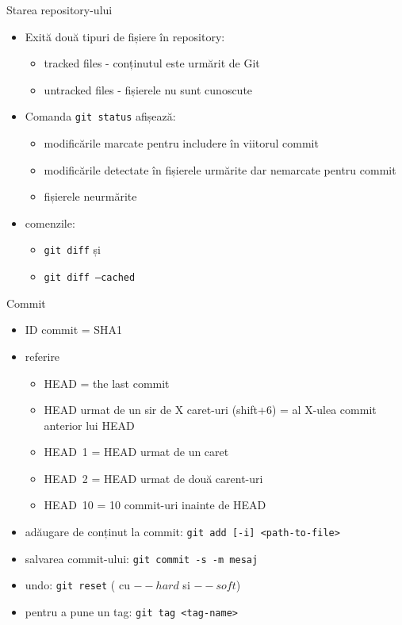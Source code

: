 \documentclass{beamer}
\begin{document}
\begin{frame}{Starea repository-ului}
\begin{itemize} %
\item Exită două tipuri de fișiere în repository:
\begin{itemize} %
	\item tracked files - conținutul este urmărit de Git
	\item untracked files - fișierele nu sunt cunoscute
\end{itemize}
\pause\item Comanda \texttt{git status} afișează:
\begin{itemize} %
	\item modificările marcate pentru includere în viitorul commit
	\item modificările detectate în fișierele urmărite dar nemarcate pentru commit
	\item fișierele neurmărite
\end{itemize}
\item comenzile:
\begin{itemize} %
	\item \texttt{git diff} și
	\item \texttt{git diff --cached}
\end{itemize}
\end{itemize}
\end{frame}

\begin{frame}{Commit}
\begin{itemize} %
\item ID commit = SHA1
\item referire
\begin{itemize}
	\item HEAD = the last commit
	\item HEAD urmat de un sir de X caret-uri (shift+6) = al X-ulea commit anterior lui HEAD
	\item HEAD~1 = HEAD urmat de un caret
    \item HEAD~2 = HEAD urmat de două carent-uri
    \item HEAD~10 = 10 commit-uri inainte de HEAD
\end{itemize}
\pause\item adăugare de conținut la commit: \texttt{git add [-i] <path-to-file>}
\item salvarea commit-ului: \texttt{git commit -s -m mesaj}
\item undo: \texttt{git reset} ( cu $--hard$ si $--soft$)
\\
\item pentru a pune un tag: \texttt{git tag <tag-name>}
\end{itemize}
\end{frame}
\end{document}
